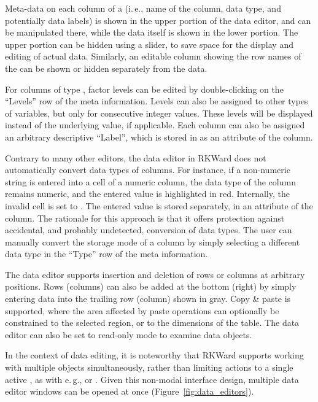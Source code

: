 Meta-data on each column of a  (i.\,e., name of the column, data
type, and potentially data labels) is shown in the upper portion of
the data editor, and can be manipulated there, while the data itself is
shown in the lower portion. The upper portion can be hidden using a
slider, to save space for the display and editing of actual data.
Similarly, an editable column showing the row names of the 
can be shown or hidden separately from the data.

For columns of type , factor levels can be edited by double-clicking on the
``Levels'' row of the meta information. Levels can also be assigned to other types of
variables, but only for consecutive integer values. These levels will
be displayed instead of the underlying value, if applicable. Each
column can also be assigned an arbitrary descriptive
``Label'', which is stored in
 as an attribute of the column.

Contrary to many other editors, the data editor in RKWard does not
automatically convert data types of columns. For instance, if a
non-numeric string is entered into a cell of a numeric column, the data
type of the column remains numeric, and the entered value is
highlighted in red. Internally, the invalid cell is set to .
The entered value is stored separately, in an attribute of the column.
The rationale for this approach is that it offers protection against
accidental, and probably undetected, conversion of data types. The
user can manually convert the storage mode of a column by simply
selecting a different data type in the ``Type'' row of the meta information.

The data editor supports insertion and deletion of rows or columns at 
arbitrary positions. Rows (columns) can also be added at the bottom 
(right) by simply entering data into the trailing row (column) shown in
gray. Copy \& paste is supported, where the area affected by paste
operations can optionally be constrained to the selected region, or to
the dimensions of the table. The data editor can also be set to read-only
mode to examine data objects.

In the context of data editing, it is noteworthy that
RKWard supports working with multiple objects simultaneously, rather than
limiting actions to a single active , as with e.\,g.,  or
. Given this non-modal interface design, multiple data editor
windows can be opened at once (Figure~\ref{fig:data_editors}).

